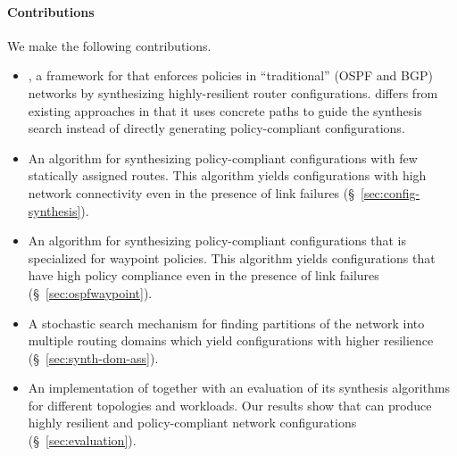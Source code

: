 \paragraph{Contributions} We make the following contributions.
\begin{itemize}	
    \item \name, a framework for
	that enforces policies in ``traditional'' (OSPF and BGP) networks
	by synthesizing highly-resilient router configurations. 		
	\name differs from existing approaches in that it uses concrete
	paths to guide the synthesis search instead of directly generating policy-compliant
	configurations.

	\item An algorithm for synthesizing policy-compliant
          configurations with few statically assigned routes. This
          algorithm yields configurations with high network
          connectivity even in the presence of link failures
          (\S~\ref{sec:config-synthesis}).

	\item An algorithm for synthesizing policy-compliant 		
		 configurations that is specialized for waypoint policies. 
		 This algorithm yields configurations that have
		 high policy compliance even in the presence of link failures (\S~\ref{sec:ospfwaypoint}). 
	
	\item A stochastic search mechanism for finding 
		partitions of the network into multiple routing domains which
		yield configurations with higher resilience (\S~\ref{sec:synth-dom-ass}).
	
	\item An implementation of \name
	together with an evaluation of its synthesis algorithms
	 for different topologies and workloads. 
	 Our results show that \name can produce highly resilient and policy-compliant
	 network configurations (\S~\ref{sec:evaluation}). 
\end{itemize}
